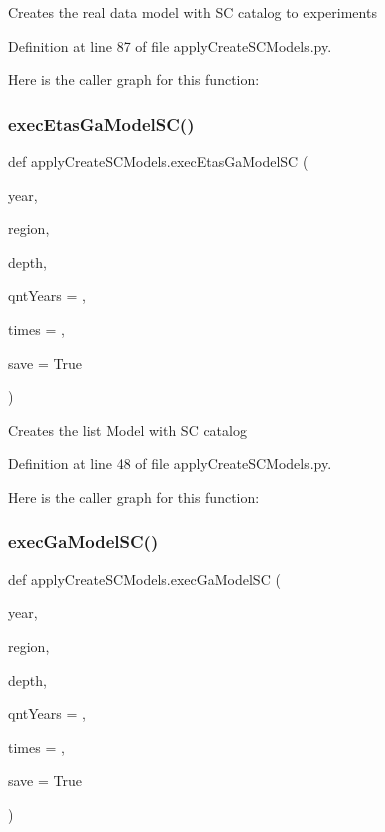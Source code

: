 \begin{DoxyVerb}Creates the real data model with SC catalog to experiments
\end{DoxyVerb}
 

Definition at line 87 of file apply\+Create\+S\+C\+Models.\+py.

Here is the caller graph for this function\+:
\mbox{\label{namespaceapply_create_s_c_models_abf6dafc972591d94c597acc2fcb90dd4}} 
\subsubsection{\texorpdfstring{exec\+Etas\+Ga\+Model\+S\+C()}{execEtasGaModelSC()}}
{\footnotesize\ttfamily def apply\+Create\+S\+C\+Models.\+exec\+Etas\+Ga\+Model\+SC (\begin{DoxyParamCaption}\item[{}]{year,  }\item[{}]{region,  }\item[{}]{depth,  }\item[{}]{qnt\+Years = {},  }\item[{}]{times = {},  }\item[{}]{save = {\ttfamily True} }\end{DoxyParamCaption})}

\begin{DoxyVerb}Creates the list Model with SC catalog
\end{DoxyVerb}
 

Definition at line 48 of file apply\+Create\+S\+C\+Models.\+py.

Here is the caller graph for this function\+:
\mbox{\label{namespaceapply_create_s_c_models_acb06a932d401dde3cc06ce800ef529fb}} 
\subsubsection{\texorpdfstring{exec\+Ga\+Model\+S\+C()}{execGaModelSC()}}
{\footnotesize\ttfamily def apply\+Create\+S\+C\+Models.\+exec\+Ga\+Model\+SC (\begin{DoxyParamCaption}\item[{}]{year,  }\item[{}]{region,  }\item[{}]{depth,  }\item[{}]{qnt\+Years = {},  }\item[{}]{times = {},  }\item[{}]{save = {\ttfamily True} }\end{DoxyParamCaption})}

